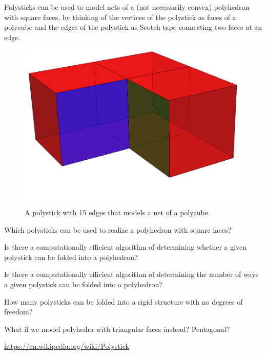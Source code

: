 \documentclass{article}
\begin{document}
Polysticks can be used to model nets of a
(not necessarily convex) polyhedron with square faces, by thinking of the
vertices of the polystick as faces of a polycube and the edges of the polystick
as Scotch tape connecting two faces at an edge.
\begin{figure}[ht!]
  \centering
  \hspace{1cm}
  \includegraphics[scale=0.6]{assets/123_problem/polyhedron_unboxed}
  \caption{
    A polystick with 15 edges that models a net of a polycube.
  }
\end{figure}

\begin{question}
  Which polysticks can be used to realize a polyhedron with square faces?
\end{question}

\begin{related}
  \item Is there a computationally efficient algorithm of determining whether
    a given polystick can be folded into a polyhedron?
  \item Is there a computationally efficient algorithm of determining the number
    of ways a given polystick can be folded into a polyhedron?
  \item How many polysticks can be folded into a rigid structure with no degrees
    of freedom?
  \item What if we model polyhedra with triangular faces instead? Pentagonal?
\end{related}

\begin{references}
  \item \url{https://en.wikipedia.org/wiki/Polystick}
\end{references}
\end{document}
